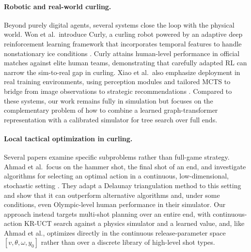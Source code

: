 \documentclass[11pt]{article}
\begin{document}
\paragraph{Robotic and real-world curling.}
Beyond purely digital agents, several systems close the loop with the
physical world. Won et al.\ introduce Curly, a curling robot powered by an
adaptive deep reinforcement learning framework that incorporates temporal
features to handle nonstationary ice conditions
\cite{doi:10.1126/scirobotics.abb9764}. Curly attains human-level performance
in official matches against elite human teams, demonstrating that carefully
adapted RL can narrow the sim-to-real gap in curling. Xiao et al.\ also
emphasize deployment in real training environments, using perception modules
and tailored MCTS to bridge from image observations to strategic
recommendations \cite{xiao2023policy}. Compared to these systems, our work
remains fully in simulation but focuses on the complementary problem of
how to combine a learned graph-transformer representation with a calibrated
simulator for tree search over full ends.

\paragraph{Local tactical optimization in curling.}
Several papers examine specific subproblems rather than full-game strategy.
Ahmad et al.\ focus on the hammer shot, the final shot of an end, and
investigate algorithms for selecting an optimal action in a continuous,
low-dimensional, stochastic setting \cite{ahmad2016action}. They adapt a
Delaunay triangulation method to this setting and show that it can
outperform alternative algorithms and, under some conditions, even
Olympic-level human performance in their simulator. Our approach instead
targets multi-shot planning over an entire end, with continuous-action
KR-UCT search against a physics simulator and a learned value, and, like
Ahmad et al., optimizes directly in the continuous release-parameter space
$[v,\theta,\omega,y_0]$ rather than over a discrete library of high-level
shot types.
\end{document}
